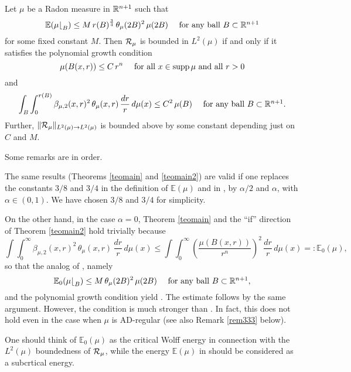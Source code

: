 \begin{theorem}\label{teomain2}
	Let $\mu$ be a Radon measure in ${\mathbb R}^{n+1}$ such that
	\begin{equation}\label{eqwolff99'}
		\mathbb E(\mu{\lfloor}_B) \leq M\,r(B)^{\frac3{4}}\,\theta_\mu(2B)^2\,\mu(2B)\quad \mbox{ for any ball $B\subset{\mathbb R}^{n+1}$}
	\end{equation}
	for some fixed constant $M$.
	Then ${\mathcal R}_\mu$ is bounded in $L^2(\mu)$ if and
	only if it satisfies the polynomial growth condition
	\begin{equation}\label{eqgrow01}
		\mu(B(x,r))\leq C\,r^n\quad \mbox{ for all $x\in\operatorname{supp}\mu$ and all $r>0$}
	\end{equation}
	and
	\begin{equation}\label{eqbetawolff2}
		\int_B\int_0^{r(B)} \beta_{\mu,2}(x,r)^2\,\theta_\mu(x,r)\,\frac{dr}r\,d\mu(x)\leq C^2\,\mu(B)\quad\mbox{ for any ball
			$B\subset{\mathbb R}^{n+1}$.}
	\end{equation}
	Further, $\|{\mathcal R}_\mu\|_{L^2(\mu)\to L^2(\mu)}$ is bounded above by some constant depending just on $C$ and $M$.
\end{theorem}



Some remarks are in order.
\begin{rem}\label{rem:exp}
	The same results (Theorems \ref{teomain} and \ref{teomain2}) are valid if one replaces the constants $3/8$ and $3/4$ in
	the definition of $\mathbb E(\mu)$ and in ,  by $\alpha/2$ and  $\alpha$, with $\alpha\in(0,1)$. We have chosen $3/8$ and $3/4$ for simplicity.
	
On the other hand, in the case $\alpha=0$, Theorem \ref{teomain} and the ``if'' direction of
Theorem \ref{teomain2} hold trivially because
$$\int \!\!\int_0^\infty \beta_{\mu,2}(x,r)^2\,\theta_\mu(x,r)\,
		\frac{dr}r\,d\mu(x) \leq \int\!\! \int_0^\infty \left(\frac{\mu(B(x,r))}{r^{n}}\right)^2\,\frac{dr}r\,d\mu(x) =: \mathbb E_0(\mu),$$
so that the analog of , namely
\begin{equation}\label{eqE000}
\mathbb E_0(\mu{\lfloor}_B) \leq M\,\theta_\mu(2B)^2\,\mu(2B)\quad \mbox{ for any ball $B\subset{\mathbb R}^{n+1}$},
\end{equation}
and the polynomial growth condition  yield . The estimate  follows by the same argument. However, the condition  is much stronger than .
In fact, this does not hold even in the case when $\mu$ is AD-regular (see also Remark \ref{rem333} below). 

One should think of $\mathbb E_0(\mu)$ as the critical Wolff energy in connection with the $L^2(\mu)$ boundedness of ${\mathcal R}_\mu$, while the energy $\mathbb E(\mu)$ in  should be considered as a subcrtical energy. 
\end{rem}


